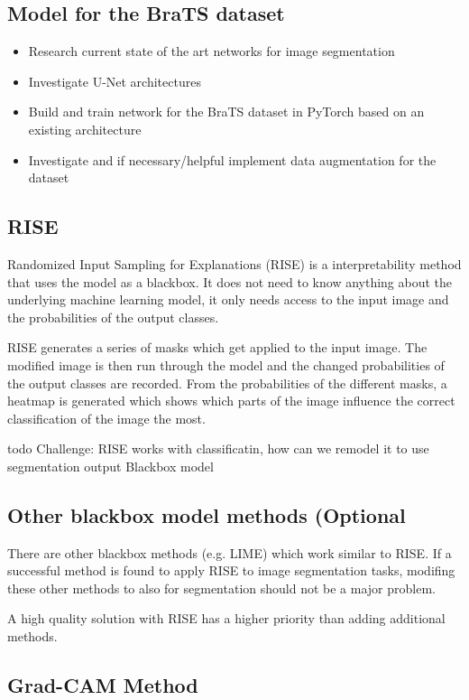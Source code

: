 \subsection{Model for the BraTS dataset}

\begin{itemize}
    \item Research current state of the art networks for image segmentation
    \item Investigate U-Net architectures
    \item Build and train network for the BraTS dataset in PyTorch based on an existing architecture
    \item Investigate and if necessary/helpful implement data augmentation for the dataset
\end{itemize}


\subsection{RISE}
Randomized Input Sampling for Explanations (RISE) is a interpretability method that uses the model as a blackbox. It does not need to know anything about the underlying machine learning model, it only needs access to the input image and the probabilities of the output classes.

RISE generates a series of masks which get applied to the input image. The modified image is then run through the model and the changed probabilities of the output classes are recorded. From the probabilities of the different masks, a heatmap is generated which shows which parts of the image influence the correct classification of the image the most.

todo Challenge: RISE works with classificatin, how can we remodel it to use segmentation output
Blackbox model

\subsection{Other blackbox model methods (Optional}
There are other blackbox methods (e.g. LIME\cite{ribeiro2016should}) which work similar to RISE. If a successful method is found to apply RISE to image segmentation tasks, modifing these other methods to also for segmentation should not be a major problem.

A high quality solution with RISE has a higher priority than adding additional methods.

\subsection{Grad-CAM Method}




